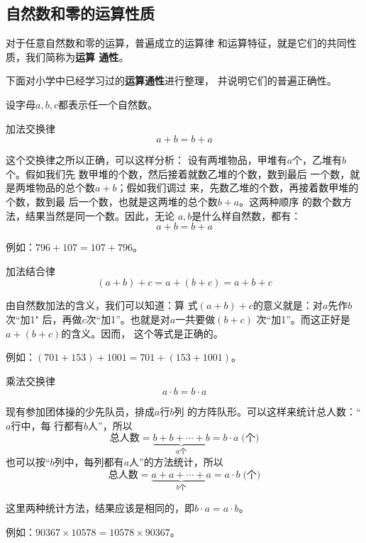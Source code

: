 \subsection{自然数和零的运算性质}
对于任意自然数和零的运算，普遍成立的运算律
和运算特征，就是它们的共同性质，我们简称为\textbf{运算
	通性}。

下面对小学中已经学习过的\textbf{运算通性}进行整理，
并说明它们的普遍正确性。

设字母$a,  b,  c$都表示任一个自然数。

\begin{blk}{加法交换律}
	\[a+b=b+a \]
\end{blk}
\begin{note}
	这个交换律之所以正确，可以这样分析：
	设有两堆物品，甲堆有$a$个，乙堆有$b$个。假如我们先
	数甲堆的个数，然后接着就数乙堆的个数，数到最后
	一个数，就是两堆物品的总个数$a+b$；假如我们调过
	来，先数乙堆的个数，再接着数甲堆的个数，数到最
	后一个数，也就是这两堆的总个数$b+a$。这两种顺序
	的数个数方法，结果当然是同一个数。因此，无论
	$a, b$是什么样自然数，都有：
	\[a+b=b+a \]
	
	例如：$796+107=107+796$。
\end{note}


\begin{blk}{加法结合律}
	\[(a+b)+c=a+(b+c)=a+b+c \]
\end{blk}
\begin{note}
	由自然数加法的含义，我们可以知道：算
	式$(a+b) +c$的意义就是：对$a$先作$b$次“加1"
	后，再做$c$次“加1”。也就是对$a$一共要做$(b+c)$
	次“加1”。而这正好是$a+ (b+c)$的含义。因而，
	这个等式是正确的。
	
	例如：$(701+153)+1001 =701+(153+1001)$。
\end{note}


\begin{blk}{乘法交换律}
	\[a\cdot b=b\cdot a \]
\end{blk}
\begin{note}
	现有参加团体操的少先队员，排成$a$行$b$列
	的方阵队形。可以这样来统计总人数：“$a$行中，每
	行都有$b$人”，所以
	\[\text{总人数}=\underbrace{b+b+\cdots+b}_{a\text{个}}=b\cdot a \; \text{(个)} \]
	也可以按“$b$列中，每列都有$a$人”的方法统计，所以
	\[\text{总人数}=\underbrace{a+a+\cdots+a}_{b\text{个}}=a\cdot b \; \text{(个)} \]
	
	这里两种统计方法，结果应该是相同的，即$b\cdot a=a\cdot b$。
	
	例如：$90367 \times  10578=10578 \times  90367$。
\end{note}


